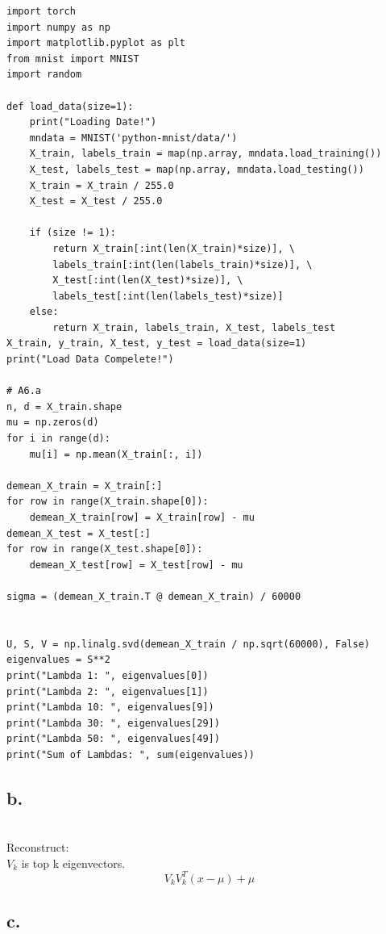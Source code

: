 \documentclass{article}
\begin{document}
\begin{verbatim}
import torch
import numpy as np
import matplotlib.pyplot as plt
from mnist import MNIST
import random

def load_data(size=1):
	print("Loading Date!")
	mndata = MNIST('python-mnist/data/')
	X_train, labels_train = map(np.array, mndata.load_training())
	X_test, labels_test = map(np.array, mndata.load_testing())
	X_train = X_train / 255.0
	X_test = X_test / 255.0
	
	if (size != 1):
		return X_train[:int(len(X_train)*size)], \
		labels_train[:int(len(labels_train)*size)], \
		X_test[:int(len(X_test)*size)], \
		labels_test[:int(len(labels_test)*size)]
	else:
		return X_train, labels_train, X_test, labels_test
X_train, y_train, X_test, y_test = load_data(size=1)
print("Load Data Compelete!")

# A6.a
n, d = X_train.shape
mu = np.zeros(d)
for i in range(d):
	mu[i] = np.mean(X_train[:, i])

demean_X_train = X_train[:]
for row in range(X_train.shape[0]):
	demean_X_train[row] = X_train[row] - mu
demean_X_test = X_test[:]
for row in range(X_test.shape[0]):
	demean_X_test[row] = X_test[row] - mu

sigma = (demean_X_train.T @ demean_X_train) / 60000


U, S, V = np.linalg.svd(demean_X_train / np.sqrt(60000), False)
eigenvalues = S**2
print("Lambda 1: ", eigenvalues[0])
print("Lambda 2: ", eigenvalues[1])
print("Lambda 10: ", eigenvalues[9])
print("Lambda 30: ", eigenvalues[29])
print("Lambda 50: ", eigenvalues[49])
print("Sum of Lambdas: ", sum(eigenvalues))
\end{verbatim}


\subsection*{b.}

 \\
Reconstruct: \\
$V_k$ is top k eigenvectors. \\
\[ V_k V_k^T (x - \mu) + \mu \]



\subsection*{c.}
\end{document}
